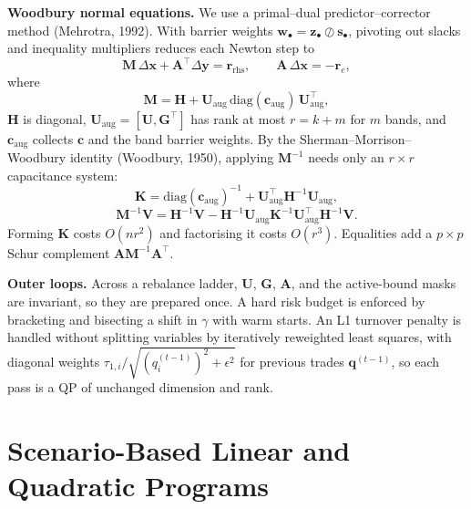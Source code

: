 \documentclass[10pt,twocolumn,letterpaper]{article}
\begin{document}
\textbf{Woodbury normal equations.} We use a primal--dual predictor--corrector method (Mehrotra, 1992). With barrier weights $\mathbf{w}_{\bullet} = \mathbf{z}_{\bullet} \oslash \mathbf{s}_{\bullet}$, pivoting out slacks and inequality multipliers reduces each Newton step to
\begin{equation}
\mathbf{M}\,\Delta\mathbf{x} + \mathbf{A}^\top \Delta\mathbf{y} = \mathbf{r}_{\text{rhs}}, \qquad \mathbf{A}\,\Delta\mathbf{x} = -\mathbf{r}_e, \label{eq:reduced_kkt}
\end{equation}
where
\begin{equation}
\mathbf{M} = \mathbf{H} + \mathbf{U}_{\text{aug}}\,\mathrm{diag}(\mathbf{c}_{\text{aug}})\,\mathbf{U}_{\text{aug}}^\top, \label{eq:m_decomp}
\end{equation}
$\mathbf{H}$ is diagonal, $\mathbf{U}_{\text{aug}} = [\mathbf{U}, \mathbf{G}^\top]$ has rank at most $r = k + m$ for $m$ bands, and $\mathbf{c}_{\text{aug}}$ collects $\mathbf{c}$ and the band barrier weights. By the Sherman--Morrison--Woodbury identity (Woodbury, 1950), applying $\mathbf{M}^{-1}$ needs only an $r \times r$ capacitance system:
\begin{equation}
\mathbf{K} = \mathrm{diag}(\mathbf{c}_{\text{aug}})^{-1} + \mathbf{U}_{\text{aug}}^\top \mathbf{H}^{-1}\mathbf{U}_{\text{aug}}, \label{eq:capacitance}
\end{equation}
\begin{equation}
\mathbf{M}^{-1}\mathbf{V} = \mathbf{H}^{-1}\mathbf{V} - \mathbf{H}^{-1}\mathbf{U}_{\text{aug}}\mathbf{K}^{-1}\mathbf{U}_{\text{aug}}^\top \mathbf{H}^{-1}\mathbf{V}. \label{eq:woodbury}
\end{equation}
Forming $\mathbf{K}$ costs $O(nr^2)$ and factorising it costs $O(r^3)$. Equalities add a $p \times p$ Schur complement $\mathbf{A}\mathbf{M}^{-1}\mathbf{A}^\top$.

\textbf{Outer loops.} Across a rebalance ladder, $\mathbf{U}$, $\mathbf{G}$, $\mathbf{A}$, and the active-bound masks are invariant, so they are prepared once. A hard risk budget is enforced by bracketing and bisecting a shift in $\gamma$ with warm starts. An L1 turnover penalty is handled without splitting variables by iteratively reweighted least squares, with diagonal weights $\tau_{1,i}/\sqrt{(q_i^{(t-1)})^2 + \epsilon^2}$ for previous trades $\mathbf{q}^{(t-1)}$, so each pass is a QP of unchanged dimension and rank.

\section{Scenario-Based Linear and Quadratic Programs}
\end{document}
